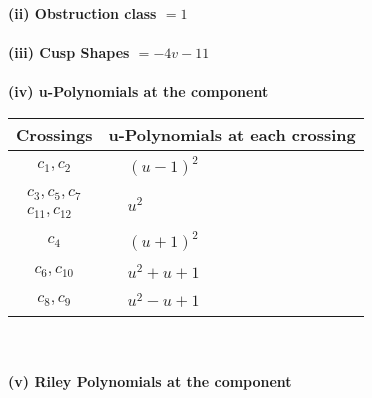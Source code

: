 \documentclass[1p]{elsarticle_modified}
\theoremstyle{definition}
\begin{document}
\flushleft \textbf{(ii) Obstruction class $= 1$}\\~\\
\flushleft \textbf{(iii) Cusp Shapes $= -4 v-11$}\\~\\
\newpage\renewcommand{\arraystretch}{1}
\flushleft \textbf{(iv) u-Polynomials at the component}\newline \\
\begin{tabular}{m{50pt}|m{274pt}}
Crossings & \hspace{64pt}u-Polynomials at each crossing \\
\hline $$\begin{aligned}c_{1},c_{2}\end{aligned}$$&$\begin{aligned}
&(u-1)^2
\end{aligned}$\\
\hline $$\begin{aligned}c_{3},c_{5},c_{7}\\c_{11},c_{12}\end{aligned}$$&$\begin{aligned}
&u^2
\end{aligned}$\\
\hline $$\begin{aligned}c_{4}\end{aligned}$$&$\begin{aligned}
&(u+1)^2
\end{aligned}$\\
\hline $$\begin{aligned}c_{6},c_{10}\end{aligned}$$&$\begin{aligned}
&u^2+u+1
\end{aligned}$\\
\hline $$\begin{aligned}c_{8},c_{9}\end{aligned}$$&$\begin{aligned}
&u^2- u+1
\end{aligned}$\\
\hline
\end{tabular}\\~\\
\newpage\renewcommand{\arraystretch}{1}
\flushleft \textbf{(v) Riley Polynomials at the component}\newline \\
\end{document}
